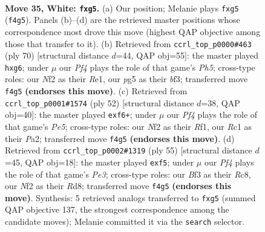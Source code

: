 \documentclass[11pt]{article}
\begin{document}
\clearpage

\begin{figure}[p]\centering
\begin{subfigure}{0.46\textwidth}\centering
\resizebox{\linewidth}{!}{%
\newchessgame
\chessboard[
  setfen={3r1kr1/1p3p1p/4b3/p2p2p1/5P2/3K1BP1/PP3N1P/2R3R1 w - - 0 35},
  showmover=false,
  pgfstyle=straightmove, color=movearrow, markmove={f4-g5}
]}
\caption{}
\end{subfigure}\hfill
\begin{subfigure}{0.46\textwidth}\centering
\resizebox{\linewidth}{!}{%
\newchessgame
\chessboard[
  setfen={6rk/1p3r2/4Rpp1/p2p3P/P2P1B2/5b1P/1P6/4R1K1 w - - 0 36},
  showmover=false,
  pgfstyle=straightmove, color=movearrow, markmove={h5-g6}
]}
\caption{}
\end{subfigure}
\\[4pt]
\begin{subfigure}{0.46\textwidth}\centering
\resizebox{\linewidth}{!}{%
\newchessgame
\chessboard[
  setfen={1n3r2/r3k3/pb2pp1p/1p2P3/4BP2/1N6/PPR1K2P/5R2 w - - 0 27},
  showmover=false,
  pgfstyle=straightmove, color=movearrow, markmove={e5-f6}
]}
\caption{}
\end{subfigure}\hfill
\begin{subfigure}{0.46\textwidth}\centering
\resizebox{\linewidth}{!}{%
\newchessgame
\chessboard[
  setfen={2rr2k1/p5p1/Pp2p2p/5P2/4bP2/2P1R1P1/1P6/R4BK1 b - - 0 28},
  showmover=false,
  pgfstyle=straightmove, color=movearrow, markmove={e6-f5}
]}
\caption{}
\end{subfigure}
\caption{\textbf{Move 35, White: \texttt{fxg5}.} (a) Our position; Melanie plays \texttt{fxg5} (\texttt{f4g5}). Panels (b)--(d) are the retrieved master positions whose correspondence most drove this move (highest QAP objective among those that transfer to it). (b) Retrieved from \texttt{ccrl\_top\_p0000\#463} (ply 70) [structural distance $d$=44, QAP obj=55]: the master played \texttt{hxg6}; under $\mu$ our \emph{Pf4} plays the role of that game's \emph{Ph5}; cross-type roles: our \emph{N}f2 as their \emph{R}e1, our \emph{p}g5 as their \emph{b}f3; transferred move \texttt{f4g5} \textbf{(endorses this move)}. (c) Retrieved from \texttt{ccrl\_top\_p0001\#1574} (ply 52) [structural distance $d$=38, QAP obj=40]: the master played \texttt{exf6+}; under $\mu$ our \emph{Pf4} plays the role of that game's \emph{Pe5}; cross-type roles: our \emph{N}f2 as their \emph{R}f1, our \emph{R}c1 as their \emph{P}a2; transferred move \texttt{f4g5} \textbf{(endorses this move)}. (d) Retrieved from \texttt{ccrl\_top\_p0002\#1319} (ply 55) [structural distance $d$=45, QAP obj=18]: the master played \texttt{exf5}; under $\mu$ our \emph{Pf4} plays the role of that game's \emph{Pe3}; cross-type roles: our \emph{B}f3 as their \emph{R}c8, our \emph{N}f2 as their \emph{R}d8; transferred move \texttt{f4g5} \textbf{(endorses this move)}. Synthesis: 5 retrieved analogs transferred to \texttt{fxg5} (summed QAP objective 137, the strongest correspondence among the candidate moves); Melanie committed it via the \texttt{search} selector.}
\label{fig:thought-m68}
\end{figure}
\end{document}
